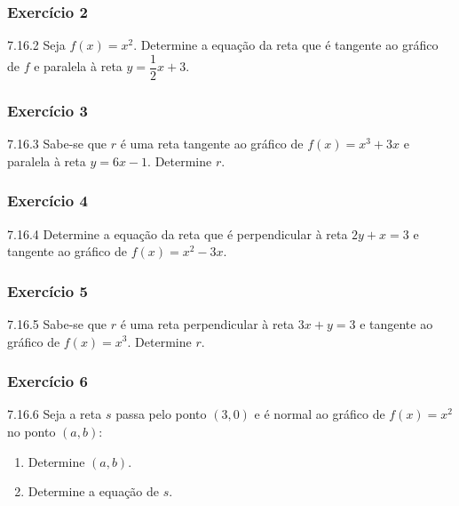 \subsubsection*{Exercício 2}
\begin{exercicio}[2]{7.16.2}
Seja $f(x) = x^2$. Determine a equação da reta que é tangente ao gráfico de $f$ e paralela à reta $y = \dfrac{1}{2}x + 3$.
\end{exercicio}

\subsubsection*{Exercício 3}
\begin{exercicio}[3]{7.16.3}
Sabe-se que $r$ é uma reta tangente ao gráfico de $f(x) = x^3 + 3x$ e paralela à reta $y = 6x - 1$. Determine $r$.
\end{exercicio}

\subsubsection*{Exercício 4}
\begin{exercicio}[4]{7.16.4}
Determine a equação da reta que é perpendicular à reta $2y + x = 3$ e tangente ao gráfico de $f(x) = x^2 - 3x$.
\end{exercicio}

\subsubsection*{Exercício 5}
\begin{exercicio}[5]{7.16.5}
Sabe-se que $r$ é uma reta perpendicular à reta $3x + y = 3$ e tangente ao gráfico de $f(x) = x^3$. Determine $r$.
\end{exercicio}

\subsubsection*{Exercício 6}
\begin{exercicio}[6]{7.16.6}
Seja a reta $s$ passa pelo ponto $(3, 0)$ e é normal ao gráfico de $f(x) = x^2$ no ponto $(a, b)$:
\begin{enumerate}[label=\alph*)]
    \item Determine $(a, b)$.
    \item Determine a equação de $s$.
\end{enumerate}
\end{exercicio}

